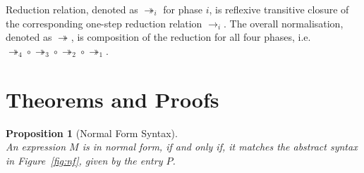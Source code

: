 \documentclass[a4paper]{article}
\newcommand{\incolor}[1]{#1}    %
\newcommand{\judgecolor}{}
\newcommand{\typecolor}{}
\newcommand{\termcolor}{}
\newcommand{\Typecolor}{}
\newcommand{\Termcolor}{}
\newcommand{\uncolored}{
  \incolor{
    \renewcommand{\judgecolor}{}
    \renewcommand{\typecolor}{}
    \renewcommand{\termcolor}{}
    \renewcommand{\Typecolor}{}
    \renewcommand{\Termcolor}{}
  }
}
\newcommand{\tp}[1]{{\typecolor #1}}
\newcommand{\tm}[1]{{\termcolor #1}}
\newcommand{\inference}[3]{\infer[\mathsf{#2}]{#3}{#1}}
\newtheorem{proposition}[theorem]{Proposition}
\newtheorem{definition}{Definition}
\newcommand{\hole}{[\ ]}
\newcommand{\typarr}[2]{#1\boldsymbol{\rightarrow}#2}
\newcommand{\expabs}[3]{\boldsymbol{\lambda}\,#1\boldsymbol{\colon}\kern-3pt#2\>\boldsymbol{.}\,#3}
\newcommand{\expapp}[2]{#1\ #2}
\newcommand{\env}{\tp{\Gamma}}
\newcommand{\typing}[2]{\tm{#1:\ }\tp{#2}}
\newcommand{\fresh}[1]{\txt{Fresh}\,(#1)}
\newcommand{\txt}[1]{\text{\textit{#1}}}
\newcommand{\rewrite}[3]{#1 \mapsto_{#2} #3}
\newcommand{\reduce}[3]{#1 \rightarrow_{#2} #3}
\newcommand{\reducestar}[3]{#1 \twoheadrightarrow_{#2} #3}
\newcommand{\norm}[1]{\txt{Norm}\,(#1)}
\begin{document}
 
Reduction relation, denoted as $\reducestar{}{i}{}$ for phase $i$, is
reflexive transitive closure of the corresponding one-step reduction
relation $\reduce{}{i}{}$. The overall normalisation, denoted as
$\reducestar{}{}{}$, is composition of the reduction for all four
phases,
i.e. $\reducestar{}{4}{}\circ\reducestar{}{3}{}\circ\reducestar{}{2}{}\circ\reducestar{}{1}{}$.

\section{Theorems and Proofs}



 

\begin{proposition}[Normal Form Syntax]\ \\
\label{prop_normal}
An expression $M$ is in normal form, if and only if, it matches the
abstract syntax in Figure~\ref{fig:nf}, given by the entry $P$.
\end{proposition}
 
\end{document}
